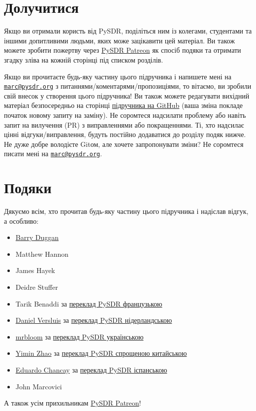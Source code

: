\section{Долучитися}\label{ux434ux43eux43bux443ux447ux438ux442ux438ux441ux44f}

Якщо ви отримали користь від PySDR, поділіться ним із колегами,
студентами та іншими допитливими людьми, яких може зацікавити цей
матеріал. Ви також можете зробити пожертву через
\href{https://www.patreon.com/PySDR}{PySDR Patreon} як спосіб подяки та
отримати згадку зліва на кожній сторінці під списком розділів.

Якщо ви прочитаєте будь-яку частину цього підручника і напишете мені на
\href{mailto:marc@pysdr.org}{\nolinkurl{marc@pysdr.org}} з
питаннями/коментарями/пропозиціями, то вітаємо, ви зробили свій внесок у
створення цього підручника! Ви також можете редагувати вихідний матеріал
безпосередньо на сторінці
\href{https://github.com/777arc/PySDR/tree/master/content}{підручника на
GitHub} (ваша зміна покладе початок новому запиту на заміну). Не
соромтеся надсилати проблему або навіть запит на вилучення (PR) з
виправленнями або покращеннями. Ті, хто надсилає цінні
відгуки/виправлення, будуть постійно додаватися до розділу подяк нижче.
Не дуже добре володієте Git\textquotesingle ом, але хочете запропонувати
зміни? Не соромтеся писати мені на
\href{mailto:marc@pysdr.org}{\nolinkurl{marc@pysdr.org}}.

\section{Подяки}\label{ux43fux43eux434ux44fux43aux438}

Дякуємо всім, хто прочитав будь-яку частину цього підручника і надіслав
відгук, а особливо:

\begin{itemize}
\tightlist
\item
  \href{http://github.com/duggabe}{Barry Duggan}
\item
  Matthew Hannon
\item
  James Hayek
\item
  Deidre Stuffer
\item
  Tarik Benaddi за \href{https://pysdr.org/fr/index-fr.html}{переклад
  PySDR французькою}
\item
  \href{https://versd.bitbucket.io/content/about.html}{Daniel Versluis}
  за \href{https://pysdr.org/nl/index-nl.html}{переклад PySDR
  нідерландською}
\item
  \href{https://github.com/mrbloom}{mrbloom} за
  \href{https://pysdr.org/ukraine/index-ukraine.html}{переклад PySDR
  українською}
\item
  \href{https://github.com/doctormin}{Yimin Zhao} за
  \href{https://pysdr.org/zh/index-zh.html}{переклад PySDR спрощеною
  китайською}
\item
  \href{https://github.com/edulchan}{Eduardo Chancay} за
  \href{https://pysdr.org/es/index-es.html}{переклад PySDR іспанською}
\item
  John Marcovici
\end{itemize}

А також усім прихильникам \href{https://www.patreon.com/PySDR}{PySDR
Patreon}!
